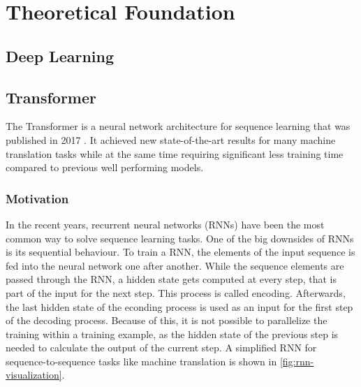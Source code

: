 \chapter{Theoretical Foundation }\label{ch:theoretical-foundation}

\Blindtext


\section{Deep Learning}

\Blindtext


\section{Transformer}\label{sec:transformer}

The Transformer is a neural network architecture for sequence learning that was published in 2017 \cite{1706.03762}.
It achieved new state-of-the-art results for many machine translation tasks while at the same time requiring significant less training time compared to previous well performing models.

\subsection{Motivation}

In the recent years, recurrent neural networks (RNNs) have been the most common way to solve sequence learning tasks.
One of the big downsides of RNNs is its sequential behaviour.
To train a RNN, the elements of the input sequence is fed into the neural network one after another.
While the sequence elements are passed through the RNN, a hidden state gets computed at every step, that is part of the input for the next step.
This process is called encoding.
Afterwards, the last hidden state of the econding process is used as an input for the first step of the decoding process.
Because of this, it is not possible to parallelize the training within a training example, as the hidden state of the previous step is needed to calculate the output of the current step. \cite[p.~~2]{1706.03762}
A simplified RNN for sequence-to-sequence tasks like machine translation is shown in \autoref{fig:rnn-visualization}.

